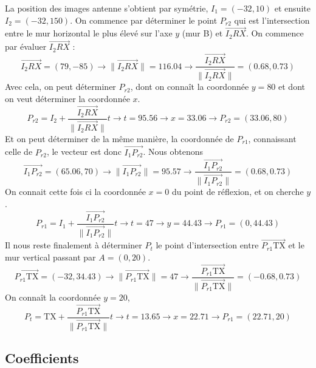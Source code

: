 La position des images antenne s'obtient par symétrie, $I_1 = (- 32, 10)$ et
ensuite $I_2 = (- 32, 150)$.
On commence par d{\'e}terminer le point $P_{r 2}$ qui est l'intersection entre
le mur horizontal le plus élevé sur l'axe $y$ (mur B) et $\overrightarrow{I_2 R
X}$. On commence par {\'e}valuer $\overrightarrow{I_2 R X}$ :
\[ \overrightarrow{I_2 R X} = (79, - 85) \rightarrow \| \overrightarrow{I_2 R
   X} \| = 116.04 \rightarrow \frac{\overrightarrow{I_2 R X}}{\|
   \overrightarrow{I_2 R X} \|} = (0.68, 0.73) \]
Avec cela, on peut d{\'e}terminer $P_{r 2}$, dont on conna{\^i}t la
coordonn{\'e}e $y = 80$ et dont on veut d{\'e}terminer la coordonn{\'e}e $x$.
\[ P_{r 2} = I_2 + \frac{\overrightarrow{I_2 R X}}{\| \overrightarrow{I_2 R X}
   \|} t \rightarrow t = 95.56 \rightarrow x = 33.06 \rightarrow P_{r 2} =
   (33.06, 80) \]
Et on peut d{\'e}terminer de la m{\^e}me mani{\`e}re, la coordonn{\'e}e de
$P_{r 1}$, connaissant celle de $P_{r 2}$, le vecteur est donc
$\overrightarrow{I_1 P_{r 2}}$. Nous obtenons
\[ \overrightarrow{I_1 P_{r 2}} = (65.06, 70) \rightarrow \|
   \overrightarrow{I_1 P_{r 2}} \| = 95.57 \rightarrow
   \frac{\overrightarrow{I_1 P_{r 2}}}{\| \overrightarrow{I_1 P_{r 2}} \|} =
   (0.68, 0.73) \]
On connait cette fois ci la coordonn{\'e}e $x = 0$ du point de r{\'e}flexion,
et on cherche $y$.
\[ P_{r 1} = I_1 + \frac{\overrightarrow{I_1 P_{r 2}}}{\| \overrightarrow{I_1
   P_{r 2}} \|} t \rightarrow t = 47 \rightarrow y = 44.43 \rightarrow P_{r 1}
   = (0, 44.43) \]
Il nous reste finalement {\`a} d{\'e}terminer $P_t$ le point d'intersection
entre $\overrightarrow{P_{r 1} \mathrm{TX}}$ et le mur vertical passant par $A =
(0, 20)$.
\[ \overrightarrow{P_{r 1} \mathrm{TX}} = (- 32, 34.43) \rightarrow \|
   \overrightarrow{P_{r 1} \mathrm{TX}} \| = 47 \rightarrow
   \frac{\overrightarrow{P_{r 1} \mathrm{TX}}}{\| \overrightarrow{P_{r 1}
   \mathrm{TX}} \|} = (- 0.68, 0.73) \]
On conna{\^i}t la coordonn{\'e}e $y = 20$,
\[ P_t = \mathrm{TX} + \frac{\overrightarrow{P_{r 1} \mathrm{TX}}}{\|
   \overrightarrow{P_{r 1} \mathrm{TX}} \|} t \rightarrow t = 13.65 \rightarrow
   x = 22.71 \rightarrow P_{r 1} = (22.71, 20) \]

\subsection{Coefficients}

